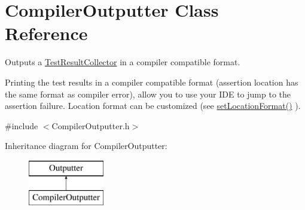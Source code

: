 \hypertarget{class_compiler_outputter}{}\section{Compiler\+Outputter Class Reference}
\label{class_compiler_outputter}


Outputs a \hyperlink{class_test_result_collector}{Test\+Result\+Collector} in a compiler compatible format.

Printing the test results in a compiler compatible format (assertion location has the same format as compiler error), allow you to use your I\+DE to jump to the assertion failure. Location format can be customized (see \hyperlink{class_compiler_outputter_a0d9e67c7bdcb443b0b2754d61a10790c}{set\+Location\+Format()} ).  




{\ttfamily \#include $<$Compiler\+Outputter.\+h$>$}

Inheritance diagram for Compiler\+Outputter\+:\begin{figure}[H]
\begin{center}
\leavevmode
\includegraphics[height=2.000000cm]{class_compiler_outputter}
\end{center}
\end{figure}
